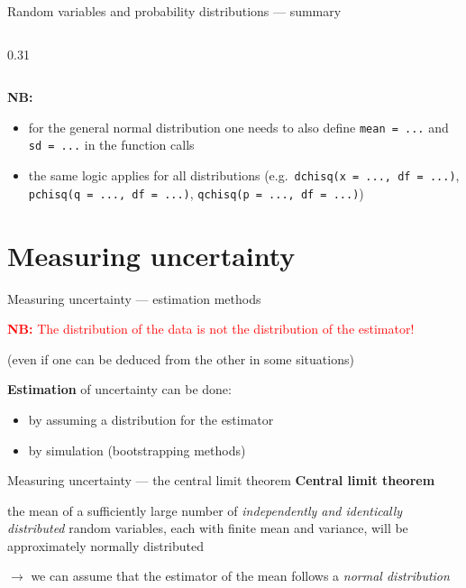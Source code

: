 \documentclass[
  ignorenonframetext,
  aspectratio=169,
  t]{beamer}
\providecommand{\tightlist}{%
  \setlength{\itemsep}{0pt}\setlength{\parskip}{0pt}}
\newcommand{\blueit}[1]{\textcolor{bluebeamer}{\emph{#1}}}
\newcommand{\bluebold}[1]{\textcolor{bluebeamer}{\textbf{#1}}}
\let\oldtexttt\texttt
\renewcommand{\texttt}[1]{\colorbox{gray!20}{\oldtexttt{#1}}}
\begin{document}
\begin{frame}[fragile]{Random variables and probability distributions
--- summary}
\begin{columns}[T]
\begin{column}{0.31\linewidth}
\normalsize
\end{column}
\end{columns}

\pause

\textbf{NB:}

\vspace{-0.2cm}

\begin{itemize}
\tightlist
\item
  for the general normal distribution one needs to also define
  \texttt{mean\ =\ ...} and \texttt{sd\ =\ ...} in the function calls
\item
  the same logic applies for all distributions
  (e.g.~\texttt{dchisq(x\ =\ ...,\ df\ =\ ...)},
  \texttt{pchisq(q\ =\ ...,\ df\ =\ ...)},
  \texttt{qchisq(p\ =\ ...,\ df\ =\ ...)})
\end{itemize}
\end{frame}

\section{Measuring uncertainty}\label{measuring-uncertainty}

\begin{frame}{Measuring uncertainty --- estimation methods}
\protect{}\label{measuring-uncertainty-estimation-methods}
\vspace{1cm}

\begin{callout}
\textcolor{red}{\textbf{NB:} The distribution of the data is not the distribution of the estimator!}

\footnotesize (even if one can be deduced from the other in some situations)\normalsize
\end{callout}

\vspace{1cm}

\bluebold{Estimation} of uncertainty can be done:

\begin{itemize}
\tightlist
\item
  by assuming a distribution for the estimator
\item
  by simulation (bootstrapping methods)
\end{itemize}
\end{frame}

\begin{frame}{Measuring uncertainty --- the central limit theorem}
\protect{}\label{measuring-uncertainty-the-central-limit-theorem}
\bluebold{Central limit theorem}

the mean of a sufficiently large number of
\blueit{independently and identically distributed} random variables,
each with finite mean and variance, will be approximately normally
distributed

\(\rightarrow\) we can assume that the estimator of the mean follows a
\blueit{normal distribution}
\end{frame}
\end{document}

